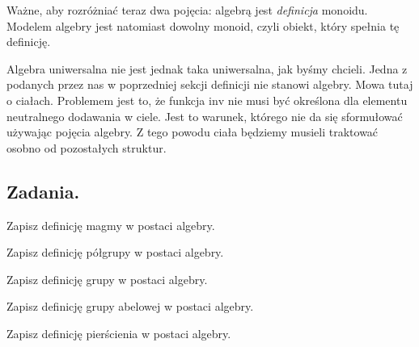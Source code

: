 Ważne, aby rozróżniać teraz dwa pojęcia: algebrą jest \textit{definicja} monoidu.
Modelem algebry jest natomiast dowolny monoid,
	czyli obiekt,
	który spełnia tę definicję.

Algebra uniwersalna nie jest jednak taka uniwersalna,
	jak byśmy chcieli.
Jedna z podanych przez nas w poprzedniej sekcji definicji nie stanowi algebry.
Mowa tutaj o ciałach.
Problemem jest to,
	że funkcja $\mathrm{inv}$ nie musi być określona dla elementu neutralnego dodawania w ciele.
Jest to warunek,
	którego nie da się sformułować używając pojęcia algebry.
Z tego powodu ciała będziemy musieli traktować osobno od pozostałych struktur.

\subsection{Zadania.}

\begin{exercise}
	Zapisz definicję magmy w postaci algebry.
\end{exercise}
\begin{exercise}
	Zapisz definicję półgrupy w postaci algebry.
\end{exercise}
\begin{exercise}
	Zapisz definicję grupy w postaci algebry.
\end{exercise}
\begin{exercise}
	Zapisz definicję grupy abelowej w postaci algebry.
\end{exercise}
\begin{exercise}
	Zapisz definicję pierścienia w postaci algebry.
\end{exercise}

